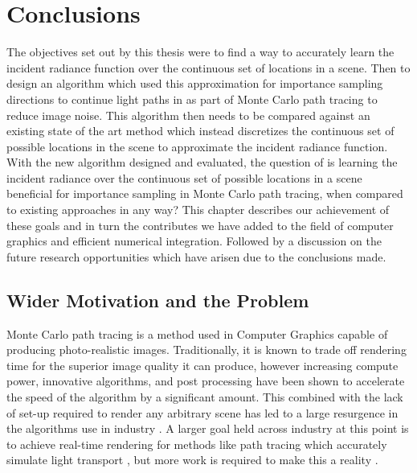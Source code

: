 \documentclass[../dissertation.tex]{subfiles}
\begin{document}
\chapter{Conclusions}
\label{chap:conclusion}

The objectives set out by this thesis were to find a way to accurately learn the incident radiance function over the continuous set of locations in a scene. Then to design an algorithm which used this approximation for importance sampling directions to continue light paths in as part of Monte Carlo path tracing to reduce image noise. This algorithm then needs to be compared against an existing state of the art method which instead discretizes the continuous set of possible locations in the scene to approximate the incident radiance function. With the new algorithm designed and evaluated, the question of is learning the incident radiance over the continuous set of possible locations in a scene beneficial for importance sampling in Monte Carlo path tracing, when compared to existing approaches in any way? This chapter describes our achievement of these goals and in turn the contributes we have added to the field of computer graphics and efficient numerical integration. Followed by a discussion on the future research opportunities which have arisen due to the conclusions made.

\section{Wider Motivation and the Problem}

Monte Carlo path tracing is a method used in Computer Graphics capable of producing photo-realistic images. Traditionally, it is known to trade off rendering time for the superior image quality it can produce, however increasing compute power, innovative algorithms, and post processing have been shown to accelerate the speed of the algorithm by a significant amount. This combined with the lack of set-up required to render any arbitrary scene has led to a large resurgence in the algorithms use in industry \cite{keller2015path}. A larger goal held across industry at this point is to achieve real-time rendering for methods like path tracing which accurately simulate light transport \cite{akenine2018real}, but more work is required to make this a reality .
\end{document}
